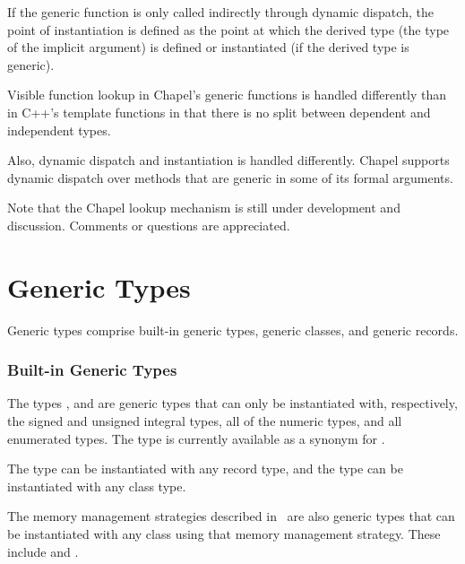 If the generic function is only called indirectly through dynamic
dispatch, the point of instantiation is defined as the point at which
the derived type (the type of the implicit  argument) is
defined or instantiated (if the derived type is generic).

\begin{rationale}
Visible function lookup in Chapel's generic functions is handled
differently than in C++'s template functions in that there is no split
between dependent and independent types.

Also, dynamic dispatch and instantiation is handled differently.
Chapel supports dynamic dispatch over methods that are generic in some
of its formal arguments.

Note that the Chapel lookup mechanism is still under development and
discussion.  Comments or questions are appreciated.
\end{rationale}

\section{Generic Types}
\label{Generic_Types}

Generic types comprise built-in generic types, generic classes, and
generic records.

\subsubsection{Built-in Generic Types}
\label{Built_in_Generic_types}

The types ,  and 
are generic types that can only be instantiated with, respectively, the
signed and unsigned integral types, all of the numeric types, and
all enumerated types. The type  is currently available
as a synonym for .

The type  can be instantiated with any record type, and
the type  can be instantiated with any class type.

The memory management strategies described in~
are also generic types that can be instantiated with any class using
that memory management strategy. These include  
 and .

